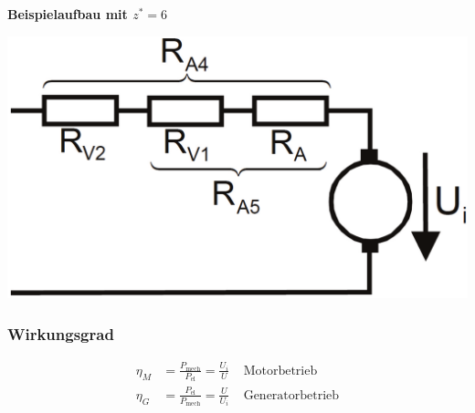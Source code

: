 \documentclass[a4paper,twocolumn,10pt]{article}
\begin{document}
\textbf{Beispielaufbau mit $z^*=6$}
\begin{center}
\includegraphics[width=0.7\linewidth]{Grafiken/Gleichstrommaschine_Vorwiderstand}
\end{center}


\subsubsection{Wirkungsgrad}
\begin{equation*}
\begin{split}
\eta_M&=\frac{P_{\text{mech}}}{P_{\text{el}}}=\frac{U_i}{U}\;\;\;\;\text{Motorbetrieb}\\
\eta_G&=\frac{P_{\text{el}}}{P_{\text{mech}}}=\frac{U}{U_i}\;\;\;\;\text{Generatorbetrieb}
\end{split}
\end{equation*}

\newpage
\end{document}
